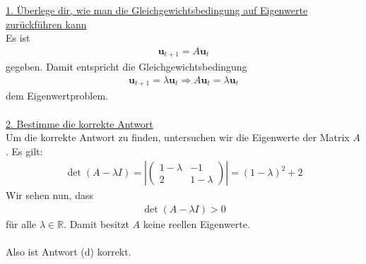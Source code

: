 \underline{1. Überlege dir, wie man die Gleichgewichtsbedingung auf Eigenwerte zurückführen kann}\\
Es ist
\begin{align*}
\textbf{u}_{t+1}= A \textbf{u}_t
\end{align*}
gegeben.
Damit entspricht die Gleichgewichtsbedingung
\begin{align*}
\textbf{u}_{t+1} = \lambda \textbf{u}_t 
\Rightarrow
A \textbf{u}_t = \lambda \textbf{u}_t 
\end{align*}
dem Eigenwertproblem.
\\
\\
\underline{2. Bestimme die korrekte Antwort}\\
Um die korrekte Antwort zu finden, untersuchen wir die Eigenwerte der Matrix $A$.
Es gilt:
\begin{align*}
\det(A - \lambda I) 
= 
\left| 
\begin{pmatrix}
1 - \lambda & -1 \\
2 	& 1 - \lambda
\end{pmatrix}
\right|
=
(1- \lambda)^2  + 2 
\end{align*}
Wir sehen nun, dass
\begin{align*}
\det(A - \lambda I) > 0
\end{align*}
für alle $\lambda \in \mathbb{R}$.
Damit besitzt $A$ keine reellen Eigenwerte.
\\
\\
Also ist Antwort (d) korrekt.